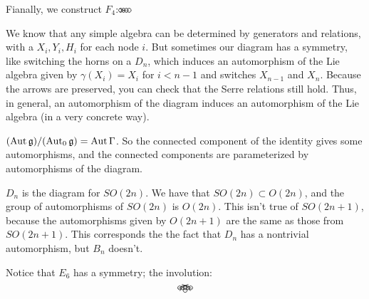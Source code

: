  Fianally, we construct $F_4$:\qquad $\begin{xy}
   (0,0) *\cir<2pt>{};
   (1,0)  *\cir<2pt>{} **@{-};
   p+(1,0)="x" *\cir<2pt>{} **@{=} ?*@{>};
   "x" *{\hspace{4pt}};"x"+(1,0)  *\cir<2pt>{} **@{-};
 \end{xy}$

 We know that any simple algebra can be determined by generators and relations, with a
 $X_i,Y_i,H_i$ for each node $i$. But sometimes our diagram has a symmetry, like
 switching the horns on a $D_n$, which induces an automorphism of the Lie algebra
 given by $\gamma(X_i)=X_i$ for $i<n-1$ and switches $X_{n-1}$ and $X_n$. Because the arrows
 are preserved, you can check that the Serre relations still hold. Thus, in general,
 an automorphism of the diagram induces an automorphism of the Lie algebra (in a very
 concrete way).

 \begin{theorem}
   $(\operatorname{Aut} \mathfrak{g})/(\operatorname{Aut}_0 \mathfrak{g}) = \operatorname{Aut} \Gamma$. So the connected component of the identity
   gives some automorphisms, and the connected components are parameterized by
   automorphisms of the diagram.
 \end{theorem}

 $D_n$ is the diagram for $SO(2n)$. We have that $SO(2n)\subset O(2n)$, and the group
 of automorphisms of $SO(2n)$ is $O(2n)$.
 This isn't true of  $SO(2n+1)$, because the automorphisms given by
 $O(2n+1)$ are the same as those from $SO(2n+1)$. This corresponds the the fact that $D_n$
 has a nontrivial automorphism, but $B_n$ doesn't.

 Notice that $E_6$ has a symmetry; the involution:
 \[\begin{xy}
   (0,0)="1" *\cir<2pt>{};
   (1,0)="2"  *\cir<2pt>{} **@{-};
   p+(1,0) *\cir<2pt>{} **@{-};
   p+(0,-1) *\cir<2pt>{} **@{-},
   p+(1,0)="22" *\cir<2pt>{} **@{-};
   p+(1,0)="11" *\cir<2pt>{} **@{-};
   "1" *+{\ };"11" *+{\ } **\crv{(2,1.5)} ?<*@{<} ?>*@{>},
   "2" *+{\ };"22" *+{\ } **\crv{(2,1)} ?<*@{<} ?>*@{>},
 \end{xy}\]

